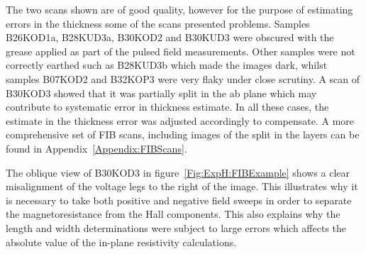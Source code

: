 The two scans shown are of good quality, however for the purpose of estimating errors in the thickness some of the scans presented problems. Samples B26KOD1a, B28KUD3a, B30KOD2 and B30KUD3 were obscured with the grease applied as part of the pulsed field measurements. Other samples were not correctly earthed such as B28KUD3b which made the images dark, whilst samples B07KOD2 and B32KOP3 were very flaky under close scrutiny. A scan of B30KOD3 showed that it was partially split in the ab plane which may contribute to systematic error in thickness estimate. In all these cases, the estimate in the thickness error was adjusted accordingly to compensate. A more comprehensive set of \ac{FIB} scans, including images of the split in the layers can be found in Appendix~\ref{Appendix:FIBScans}.

The oblique view of B30KOD3 in figure~\ref{Fig:ExpH:FIBExample} shows a clear misalignment of the voltage legs to the right of the image. This illustrates why it is necessary to take both positive and negative field sweeps in order to separate the magnetoresistance from the Hall components. This also explains why the length and width determinations were subject to large errors which affects the absolute value of the in-plane resistivity calculations.

